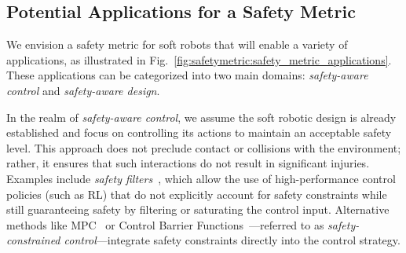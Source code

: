 \subsection{Potential Applications for a Safety Metric}\label{sub:safetymetric:safety_metric_applications}
We envision a safety metric for soft robots that will enable a variety of applications, as illustrated in Fig.~\ref{fig:safetymetric:safety_metric_applications}. These applications can be categorized into two main domains: \emph{safety-aware control} and \emph{safety-aware design}.

In the realm of \emph{safety-aware control}, we assume the soft robotic design is already established and focus on controlling its actions to maintain an acceptable safety level. This approach does not preclude contact or collisions with the environment; rather, it ensures that such interactions do not result in significant injuries. Examples include \emph{safety filters}~\citep{bertino2023prescribed}, which allow the use of high-performance control policies (such as \gls{RL}) that do not explicitly account for safety constraints while still guaranteeing safety by filtering or saturating the control input. Alternative methods like \gls{MPC}~\citep{hewing2020learning} or Control Barrier Functions~\citep{ames2016control}—referred to as \emph{safety-constrained control}—integrate safety constraints directly into the control strategy.

